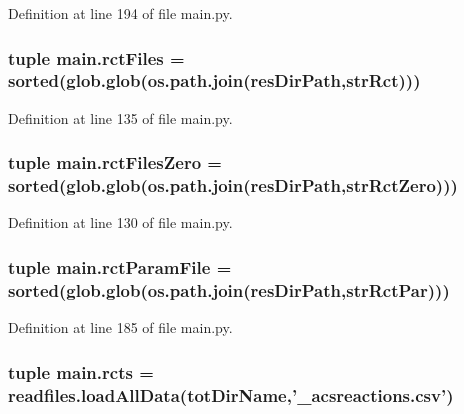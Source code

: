 Definition at line 194 of file main.\-py.

\hypertarget{a00151_a9016a8f5eafe76e4e8dbb1bc3ce94af5}{
\subsubsection[{rct\-Files}]{\setlength{\rightskip}{0pt plus 5cm}tuple main.\-rct\-Files = sorted(glob.\-glob(os.\-path.\-join({\bf res\-Dir\-Path},{\bf str\-Rct})))}}\label{a00151_a9016a8f5eafe76e4e8dbb1bc3ce94af5}


Definition at line 135 of file main.\-py.

\hypertarget{a00151_aa37eddd86a00bf98dff8cc9260d6d13b}{
\subsubsection[{rct\-Files\-Zero}]{\setlength{\rightskip}{0pt plus 5cm}tuple main.\-rct\-Files\-Zero = sorted(glob.\-glob(os.\-path.\-join({\bf res\-Dir\-Path},{\bf str\-Rct\-Zero})))}}\label{a00151_aa37eddd86a00bf98dff8cc9260d6d13b}


Definition at line 130 of file main.\-py.

\hypertarget{a00151_ac4e9cba2fd0b813ba19029541ad609e5}{
\subsubsection[{rct\-Param\-File}]{\setlength{\rightskip}{0pt plus 5cm}tuple main.\-rct\-Param\-File = sorted(glob.\-glob(os.\-path.\-join({\bf res\-Dir\-Path},{\bf str\-Rct\-Par})))}}\label{a00151_ac4e9cba2fd0b813ba19029541ad609e5}


Definition at line 185 of file main.\-py.

\hypertarget{a00151_ac2fe1ed3228b8e616f25ccfbe4cc7dc4}{
\subsubsection[{rcts}]{\setlength{\rightskip}{0pt plus 5cm}tuple main.\-rcts = readfiles.\-load\-All\-Data({\bf tot\-Dir\-Name},'\-\_\-acsreactions.\-csv')}}\label{a00151_ac2fe1ed3228b8e616f25ccfbe4cc7dc4}


